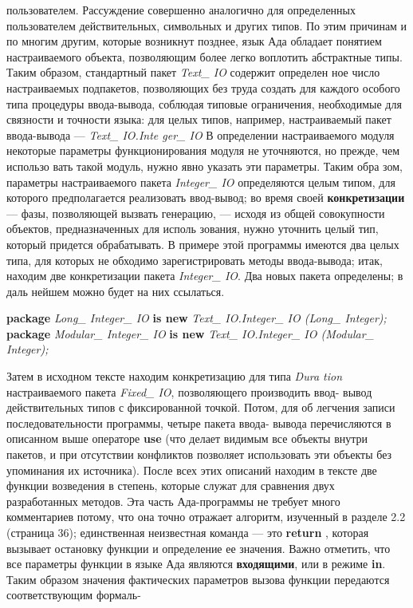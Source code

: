 \documentclass{mai_book}
\begin{document}
\newpage

пользователем. Рассуждение совершенно аналогично для определенных
пользователем действительных, символьных и других типов. По этим
причинам и по многим другим, которые возникнут позднее, язык Ада
обладает понятием настраиваемого объекта, позволяющим более легко
воплотить абстрактные типы.
Таким образом, стандартный пакет {\it Text\_ IO} содержит определен­
ное число настраиваемых подпакетов, позволяющих без труда создать
для каждого особого типа процедуры ввода-вывода, соблюдая типовые
ограничения, необходимые для связности и точности языка: для целых
типов, например, настраиваемый пакет ввода-вывода — {\it Text\_ IO.Inte­
ger\_ IO} В определении настраиваемого модуля некоторые параметры
функционирования модуля не уточняются, но прежде, чем использо­
вать такой модуль, нужно явно указать эти параметры. Таким обра­
зом, параметры настраиваемого пакета {\it Integer\_ IO} определяются целым
типом, для которого предполагается реализовать ввод-вывод; во время
своей {\bf конкретизации} — фазы, позволяющей вызвать генерацию, —
исходя из общей совокупности объектов, предназначенных для исполь­
зования, нужно уточнить целый тип, который придется обрабатывать.
В примере этой программы имеются два целых типа, для которых не­
обходимо зарегистрировать методы ввода-вывода; итак, находим две
конкретизации пакета {\it Integer\_ IO}. Два новых пакета определены; в даль­
нейшем можно будет на них ссылаться.
\begin{center}
\parbox{14cm}{
{\bf package} {\it Long\_ Integer\_ IO} {\bf is new} {\it Text\_ IO.Integer\_ IO (Long\_ Integer);}\\
{\bf package} {\it Modular\_ Integer\_ IO} {\bf is new} {\it Text\_ IO.Integer\_ IO (Modular\_ Integer);}}
\end{center}
Затем в исходном тексте находим конкретизацию для типа {\it Dura­
tion} настраиваемого пакета {\it Fixed\_ IO}, позволяющего производить ввод-
вывод действительных типов с фиксированной точкой. Потом, для об­
легчения записи последовательности программы, четыре пакета ввода-
вывода перечисляются в описанном выше операторе {\bf use} (что делает
видимым все объекты внутри пакетов, и при отсутствии конфликтов
позволяет использовать эти объекты без упоминания их источника).
После всех этих описаний находим в тексте две функции возведения
в степень, которые служат для сравнения двух разработанных методов.
Эта часть Ада-программы не требует много комментариев потому, что
она точно отражает алгоритм, изученный в разделе 2.2 (страница 36);
единственная неизвестная команда — это {\bf return} , которая вызывает
остановку функции и определение ее значения.
Важно отметить, что все параметры функции в языке Ада являются
{\bf входящими}, или в режиме {\bf in}. Таким образом значения фактических
параметров вызова функции передаются соответствующим формаль-
\newpage
\end{document}
